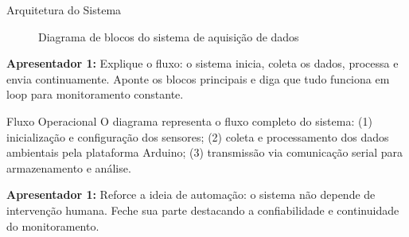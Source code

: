 \documentclass{beamer}
\begin{document}
\begin{frame}{Arquitetura do Sistema}
\begin{figure}[H]
    \centering
    \caption{Diagrama de blocos do sistema de aquisição de dados}
\end{figure}

\begin{tcolorbox}[roteiro]
\textbf{Apresentador 1:}  
Explique o fluxo: o sistema inicia, coleta os dados, processa e envia continuamente.  
Aponte os blocos principais e diga que tudo funciona em loop para monitoramento constante.
\end{tcolorbox}
\end{frame}

\begin{frame}{Fluxo Operacional}
\justifying
O diagrama representa o fluxo completo do sistema:  
(1) inicialização e configuração dos sensores;  
(2) coleta e processamento dos dados ambientais pela plataforma Arduino;  
(3) transmissão via comunicação serial para armazenamento e análise.

\begin{tcolorbox}[roteiro]
\textbf{Apresentador 1:}  
Reforce a ideia de automação: o sistema não depende de intervenção humana.  
Feche sua parte destacando a confiabilidade e continuidade do monitoramento.
\end{tcolorbox}
\end{frame}

\end{document}
